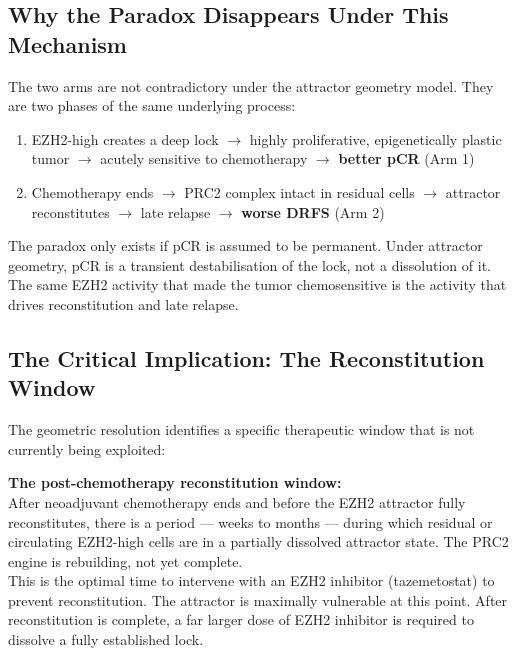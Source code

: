 \documentclass[12pt, a4paper]{article}
\begin{document}
\subsection{Why the Paradox Disappears Under
This Mechanism}

The two arms are not contradictory under the
attractor geometry model. They are two phases of
the same underlying process:

\begin{enumerate}
    \item EZH2-high creates a deep lock
    $\rightarrow$ highly proliferative, epigenetically
    plastic tumor
    $\rightarrow$ acutely sensitive to chemotherapy
    $\rightarrow$ \textbf{better pCR} (Arm 1)

    \item Chemotherapy ends
    $\rightarrow$ PRC2 complex intact in residual cells
    $\rightarrow$ attractor reconstitutes
    $\rightarrow$ late relapse
    $\rightarrow$ \textbf{worse DRFS} (Arm 2)
\end{enumerate}

The paradox only exists if pCR is assumed to be
permanent. Under attractor geometry, pCR is
a transient destabilisation of the lock, not
a dissolution of it. The same EZH2 activity that
made the tumor chemosensitive is the activity that
drives reconstitution and late relapse.

\subsection{The Critical Implication: The
Reconstitution Window}

The geometric resolution identifies a specific
therapeutic window that is not currently being
exploited:

\begin{center}
\colorbox{novelbox}{
\begin{minipage}{0.82\textwidth}
\vspace{0.5em}
\textbf{The post-chemotherapy reconstitution window:}\\[0.4em]
After neoadjuvant chemotherapy ends and before
the EZH2 attractor fully reconstitutes, there is
a period --- weeks to months --- during which
residual or circulating EZH2-high cells are in
a partially dissolved attractor state. The PRC2
engine is rebuilding, not yet complete.\\[0.4em]
This is the optimal time to intervene with an
EZH2 inhibitor (tazemetostat) to prevent
reconstitution. The attractor is maximally
vulnerable at this point. After reconstitution
is complete, a far larger dose of EZH2 inhibitor
is required to dissolve a fully established lock.
\vspace{0.5em}
\end{minipage}}
\end{center}
\end{document}
